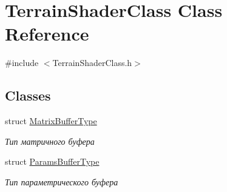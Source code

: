\hypertarget{class_terrain_shader_class}{}\section{Terrain\+Shader\+Class Class Reference}
\label{class_terrain_shader_class}


{\ttfamily \#include $<$Terrain\+Shader\+Class.\+h$>$}

\subsection*{Classes}
\begin{DoxyCompactItemize}
\item 
struct \hyperlink{struct_terrain_shader_class_1_1_matrix_buffer_type}{Matrix\+Buffer\+Type}
\begin{DoxyCompactList}\small\item\em Тип матричного буфера \end{DoxyCompactList}\item 
struct \hyperlink{struct_terrain_shader_class_1_1_params_buffer_type}{Params\+Buffer\+Type}
\begin{DoxyCompactList}\small\item\em Тип параметрического буфера \end{DoxyCompactList}\end{DoxyCompactItemize}
